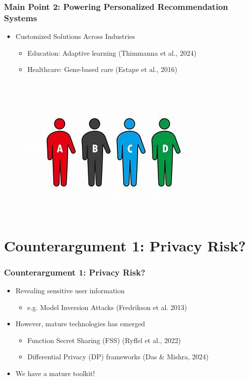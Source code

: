 \documentclass{beamer}
\begin{document}
\begin{frame}
 \frametitle{Main Point 2: Powering Personalized Recommendation Systems}
\begin{minipage}{\textwidth}
{\linespread{1.3}
\begin{itemize}
    \item {\Large Customized Solutions Across Industries}
    \begin{itemize}
        \item <1-> {\large Education: Adaptive learning} (Thimmanna et al., 2024)
        \item <2-> {\large Healthcare: Gene-based care} (Estape et al., 2016)
    \end{itemize}
\end{itemize}
}
\begin{figure}
    \centering
    \includegraphics[width=0.45\linewidth]{figure 5.png}
    \label{fig:enter-label}
\end{figure}
\end{minipage}
\end{frame}



\section{Counterargument 1: Privacy Risk?}
\begin{frame}
 \frametitle{Counterargument 1: Privacy Risk?}
\begin{minipage}{\textwidth}
{\linespread{2}
\begin{itemize}
    \item <1-> {\Large Revealing sensitive user information}\\
    \begin{itemize}
        \item {\large e.g. Model Inversion Attacks} (Fredrikson et al. 2013)
    \end{itemize}
    \item <2-> {\Large However, mature technologies has emerged}
    \begin{itemize}
        \item {\large Function Secret Sharing (FSS)} (Ryffel et al., 2022)
        \item {\large Differential Privacy (DP) frameworks} (Das \& Mishra, 2024)
    \end{itemize}
    \item <3-> {\Large We have a mature toolkit!}
\end{itemize}
}

\end{minipage}
\end{frame}
\end{document}
